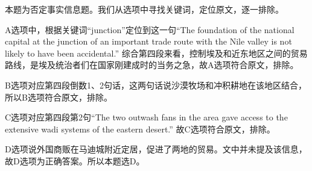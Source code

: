 \begin{blk}
    \begin{nlz}
        本题为否定事实信息题。我们从选项中寻找关键词，定位原文，逐一排除。

        A选项中，根据关键词“junction”定位到这一句“The foundation of the national capital at the junction of an important trade route with the Nile valley is not likely to have been accidental.” 综合第四段来看，控制埃及和近东地区之间的贸易路线，是埃及统治者们在国家刚建成时的当务之急，故A选项符合原文，排除。

        B选项对应第四段倒数1、2句话，这两句话说沙漠牧场和冲积耕地在该地区结合，所以B选项符合原文，排除。

        C选项对应第四段第2句“The two outwash fans in the area gave access to the extensive wadi systems of the eastern desert.” 故C选项符合原文，排除。

        D选项说外国商贩在马迪城附近定居，促进了两地的贸易。文中并未提及该信息，故D选项为正确答案。所以本题选D。
    \end{nlz}
\end{blk}

